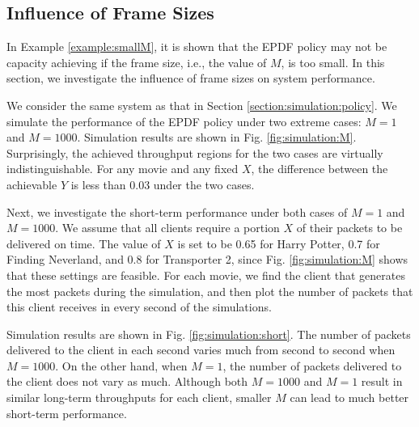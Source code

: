 \documentclass[10pt,nocopyrightspace]{sigplan-proc-varsize-1in}
\begin{document}
\subsection{Influence of Frame Sizes}

\begin{figure*}[t]
\hspace{0.01\linewidth} 
\hspace{0.01\linewidth} 
\caption{Achieved throughput regions for different frame sizes.}\label{fig:simulation:M}
\end{figure*}


In Example \ref{example:smallM}, it is shown that the EPDF policy may not be capacity achieving if the frame size, i.e., the value of $M$, is too small. In this section, we investigate the influence of frame sizes on system performance.

We consider the same system as that in Section \ref{section:simulation:policy}. We simulate the performance of the EPDF policy under two extreme cases: $M=1$ and $M=1000$. Simulation results are shown in Fig. \ref{fig:simulation:M}. Surprisingly, the achieved throughput regions for the two cases are virtually indistinguishable. For any movie and any fixed $X$, the difference between the achievable $Y$ is less than 0.03 under the two cases.

Next, we investigate the short-term performance under both cases of $M=1$ and $M=1000$. We assume that all clients require a portion $X$ of their packets to be delivered on time. The value of $X$ is set to be 0.65 for Harry Potter, 0.7 for Finding Neverland, and 0.8 for Transporter 2, since Fig. \ref{fig:simulation:M} shows that these settings are feasible. For each movie, we find the client that generates the most packets during the simulation, and then plot the number of packets that this client receives in every second of the simulations.

Simulation results are shown in Fig. \ref{fig:simulation:short}. The number of packets delivered to the client in each second varies much from second to second when $M=1000$. On the other hand, when $M=1$, the number of packets delivered to the client does not vary as much. Although both $M=1000$ and $M=1$ result in similar long-term throughputs for each client, smaller $M$ can lead to much better short-term performance.
\end{document}
